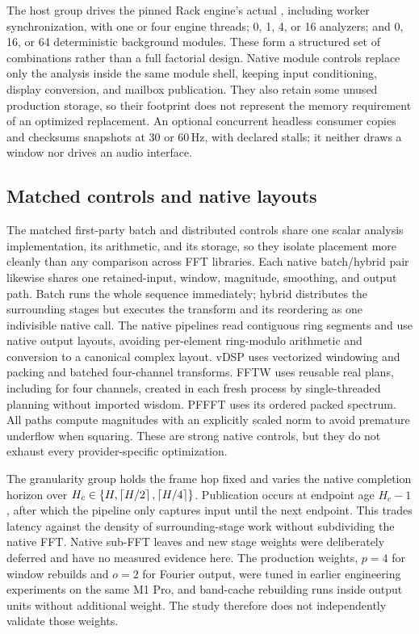 The host group drives the pinned Rack engine's actual ,
including worker synchronization, with one or four engine threads; 0, 1, 4,
or 16 analyzers; and 0, 16, or 64 deterministic background modules. These form
a structured set of combinations rather than a full factorial design. Native
module controls replace only the analysis inside the same module shell,
keeping input conditioning, display conversion, and mailbox publication. They
also retain some unused production storage, so their footprint does not
represent the memory requirement of an optimized replacement. An optional
concurrent headless consumer copies and checksums snapshots at 30 or 60\,Hz,
with declared stalls; it neither draws a window nor drives an audio interface.

\subsection{Matched controls and native layouts}
The matched first-party batch and distributed controls share one scalar
analysis implementation, its arithmetic, and its storage, so they isolate
placement more cleanly than any comparison across FFT libraries. Each native
batch/hybrid pair likewise shares one retained-input, window, magnitude,
smoothing, and output path. Batch runs the whole sequence immediately; hybrid
distributes the surrounding stages but executes the transform and its
reordering as one indivisible native call. The native pipelines read
contiguous ring segments and use native output layouts, avoiding per-element
ring-modulo arithmetic and conversion to a canonical complex layout. vDSP
uses vectorized windowing and packing and batched four-channel transforms.
FFTW uses reusable real plans, including  for four channels,
created in each fresh process by single-threaded  planning
without imported wisdom. PFFFT uses its ordered packed spectrum. All paths
compute magnitudes with an explicitly scaled norm to avoid premature underflow
when squaring. These are strong native controls, but they do not exhaust every
provider-specific optimization.

The granularity group holds the frame hop fixed and varies the native
completion horizon over $H_c\in\{H,\left\lceil H/2\right\rceil,\left\lceil H/4\right\rceil\}$. Publication
occurs at endpoint age $H_c-1$, after which the pipeline only captures input
until the next endpoint. This trades latency against the density of
surrounding-stage work without subdividing the native FFT. Native sub-FFT
leaves and new stage weights were deliberately deferred and have no measured
evidence here. The production weights, $p=4$ for window rebuilds and $o=2$
for Fourier output, were tuned in earlier engineering experiments on the same
M1 Pro, and band-cache rebuilding runs inside output units without additional
weight. The study therefore does not independently validate those weights.

